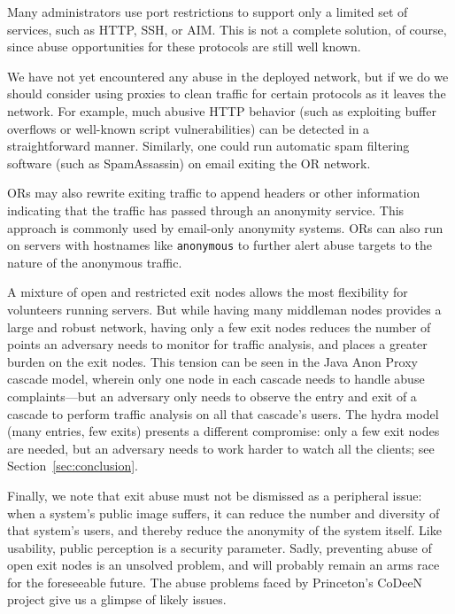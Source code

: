 \documentclass[times,10pt,twocolumn]{article}
\begin{document}

Many administrators use port restrictions to support only a
limited set of services, such as HTTP, SSH, or AIM.
This is not a complete solution, of course, since abuse opportunities for these
protocols are still well known.

We have not yet encountered any abuse in the deployed network, but if
we do we should consider using proxies to clean traffic for certain
protocols as it leaves the network.  For example, much abusive HTTP
behavior (such as exploiting buffer overflows or well-known script
vulnerabilities) can be detected in a straightforward manner.
Similarly, one could run automatic spam filtering software (such as
SpamAssassin) on email exiting the OR network.

ORs may also rewrite exiting traffic to append
headers or other information indicating that the traffic has passed
through an anonymity service.  This approach is commonly used
by email-only anonymity systems.  ORs can also
run on servers with hostnames like {\tt anonymous} to further
alert abuse targets to the nature of the anonymous traffic.

A mixture of open and restricted exit nodes allows the most
flexibility for volunteers running servers. But while having many
middleman nodes provides a large and robust network,
having only a few exit nodes reduces the number of points
an adversary needs to monitor for traffic analysis, and places a
greater burden on the exit nodes.  This tension can be seen in the
Java Anon Proxy
cascade model, wherein only one node in each cascade needs to handle
abuse complaints---but an adversary only needs to observe the entry
and exit of a cascade to perform traffic analysis on all that
cascade's users. The hydra model (many entries, few exits) presents a
different compromise: only a few exit nodes are needed, but an
adversary needs to work harder to watch all the clients; see
Section~\ref{sec:conclusion}.

Finally, we note that exit abuse must not be dismissed as a peripheral
issue: when a system's public image suffers, it can reduce the number
and diversity of that system's users, and thereby reduce the anonymity
of the system itself.  Like usability, public perception is a
security parameter.  Sadly, preventing abuse of open exit nodes is an
unsolved problem, and will probably remain an arms race for the
foreseeable future.  The abuse problems faced by Princeton's CoDeeN
project \cite{darkside} give us a glimpse of likely issues.
\end{document}
